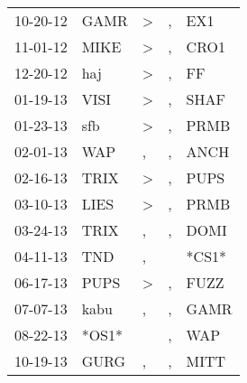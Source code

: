 \begin{supertabular}{p{0.07\textwidth}p{0.06\textwidth}p{0.02\textwidth}p{0.02\textwidth}p{0.06\textwidth}}
          10-20-12\textsuperscript{} &           GAMR\textsuperscript{} &     \textgreater &                , &            EX1\textsuperscript{} \\
          11-01-12\textsuperscript{} &           MIKE\textsuperscript{} &     \textgreater &                , &           CRO1\textsuperscript{} \\
          12-20-12\textsuperscript{} &            haj\textsuperscript{} &     \textgreater &                , &             FF\textsuperscript{} \\
          01-19-13\textsuperscript{} &           VISI\textsuperscript{} &     \textgreater &                , &           SHAF\textsuperscript{} \\
          01-23-13\textsuperscript{} &            sfb\textsuperscript{} &     \textgreater &                , &           PRMB\textsuperscript{} \\
          02-01-13\textsuperscript{} &            WAP\textsuperscript{} &                , &                , &           ANCH\textsuperscript{} \\
          02-16-13\textsuperscript{} &           TRIX\textsuperscript{} &     \textgreater &                , &           PUPS\textsuperscript{} \\
          03-10-13\textsuperscript{} &           LIES\textsuperscript{} &     \textgreater &                , &           PRMB\textsuperscript{} \\
          03-24-13\textsuperscript{} &           TRIX\textsuperscript{} &                , &                , &           DOMI\textsuperscript{} \\
          04-11-13\textsuperscript{} &            TND\textsuperscript{} &                , &                  &                            *CS1* \\
          06-17-13\textsuperscript{} &           PUPS\textsuperscript{} &     \textgreater &                , &           FUZZ\textsuperscript{} \\
          07-07-13\textsuperscript{} &           kabu\textsuperscript{} &                , &                , &           GAMR\textsuperscript{} \\
          08-22-13\textsuperscript{} &                            *OS1* &                  &                , &            WAP\textsuperscript{} \\
          10-19-13\textsuperscript{} &           GURG\textsuperscript{} &                , &                , &           MITT\textsuperscript{} \\

\end{supertabular}
